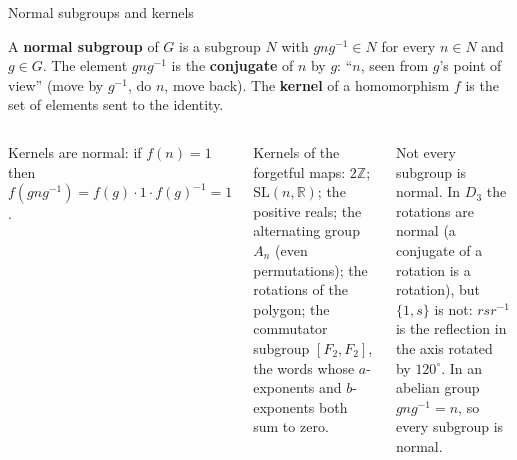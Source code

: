 \documentclass[aspectratio=169,10pt]{beamer}
\newcommand{\Z}{\mathbb{Z}}
\newcommand{\R}{\mathbb{R}}
\newcommand{\SL}{\mathrm{SL}}
\newcommand{\inv}{^{-1}}
\begin{document}
\begin{frame}{Normal subgroups and kernels}
\begin{defbox}
A \textbf{normal subgroup} of $G$ is a subgroup $N$ with $gng\inv\in N$ for every $n\in N$ and $g\in G$. The element $gng\inv$ is the \textbf{conjugate} of $n$ by $g$: ``$n$, seen from $g$'s point of view'' (move by $g\inv$, do $n$, move back). The \textbf{kernel} of a homomorphism $f$ is the set of elements sent to the identity.
\end{defbox}
\begin{columns}[T]
\centering\scalebox{0.64}{\fighomdots}
\footnotesize
\begin{whybox}
Kernels are normal: if $f(n)=1$ then $f(gng\inv)=f(g)\cdot1\cdot f(g)\inv=1$.
\end{whybox}
Kernels of the forgetful maps: $2\Z$; $\SL(n,\R)$; the positive reals; the alternating group $A_n$ (even permutations); the rotations of the polygon; the commutator subgroup $[F_2,F_2]$, the words whose $a$-exponents and $b$-exponents both sum to zero.
\begin{pitbox}
Not every subgroup is normal. In $D_3$ the rotations are normal (a conjugate of a rotation is a rotation), but $\{1,s\}$ is not: $rsr\inv$ is the reflection in the axis rotated by $120^\circ$. In an abelian group $gng\inv=n$, so every subgroup is normal.
\end{pitbox}
\end{columns}
\end{frame}
\end{document}
